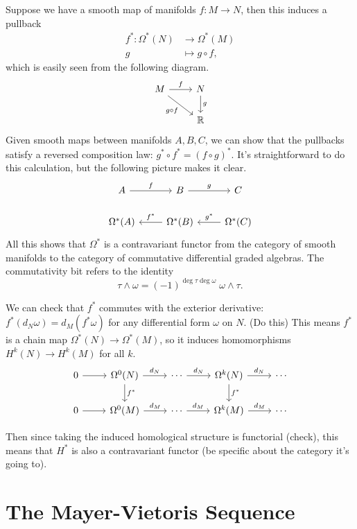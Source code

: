 \documentclass[twoside,10pt]{article}
\begin{document}
Suppose we have a smooth map of manifolds $f:M\to N$, then this induces a pullback
\begin{align*}
	f^{*}:\Omega^{*}(N)&\to \Omega^{*}(M)\\
	g&\mapsto g\circ f,
\end{align*}
which is easily seen from the following diagram.
\[
\begin{tikzcd}
	M\rar{f}\arrow[dr,"g\circ f"']&N\dar{g}\\
				     &\mathbb{R}
\end{tikzcd}
\]
Given smooth maps between manifolds $A,B,C$, we can show that the pullbacks satisfy a reversed composition law: $g^{*}\circ f^{*}=(f\circ g)^{*}$. {\color{red}It's straightforward} to do this calculation, but the following picture makes it clear.
\[
\begin{tikzcd}
	A\rar{f}&B\rar{g}&C\\
	\Omega^{*}(A)&\Omega^{*}(B)\arrow[l,"f^{*}"']&\Omega^{*}(C)\arrow[l,"g^{*}"']
\end{tikzcd}
\] All this shows that $\Omega^{*}$ is a contravariant functor from the category of smooth manifolds to the category of commutative differential graded algebras. The commutativity bit refers to the identity
\[
	\tau \wedge \omega = (-1)^{\deg \tau \deg \omega} \; \omega \wedge \tau.
\] 

We can check that $f^{*}$ commutes with the exterior derivative: $f^{*}(d_{N}\omega) = d_{M}(f^{*}\omega)$ for any differential form $\omega$ on $N$. {\color{red}(Do this)} This means $f^{*}$ is a chain map $\Omega^{*}(N) \to \Omega^{*}(M)$, so it induces homomorphisms $H^{k}(N)\to H^{k}(M)$ for all $k$.
\[
\begin{tikzcd}
	0\rar&\Omega^{0}(N)\rar{d_{N}}\dar{f^{*}}&\cdots\rar{d_{N}}&\Omega^{k}(N)\rar{d_{N}}\dar{f^{*}}&\cdots\\
	0\rar&\Omega^{0}(M)\rar{d_{M}}&\cdots\rar{d_{M}}&\Omega^{k}(M)\rar{d_{M}}&\cdots
\end{tikzcd}
\] 

Then since taking the induced homological structure is functorial {\color{red}(check)}, this means that $H^{*}$ is also a contravariant functor {\color{red}(be specific about the category it's going to)}.


\section{The Mayer-Vietoris Sequence}
\end{document}
